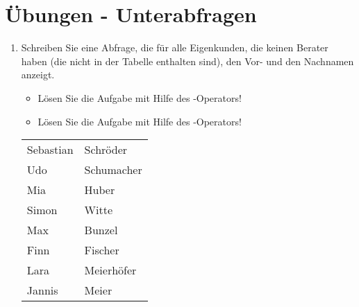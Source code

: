 \clearpage
    \section{\"Ubungen - Unterabfragen}
      \begin{enumerate}
        \item Schreiben Sie eine Abfrage, die f\"ur alle Eigenkunden, die keinen
        Berater haben (die nicht in der Tabelle
         enthalten sind), den Vor- und den
        Nachnamen anzeigt.
        \begin{itemize}
          \item L\"osen Sie die Aufgabe mit Hilfe des -Operators!
          \item L\"osen Sie die Aufgabe mit Hilfe des -Operators!
        \end{itemize}
        \begin{center}
          \begin{small}
            \tablehead{}
            \begin{msoraclesql}
              \begin{supertabular}{ll}
                Sebastian & Schr\"oder \\
                Udo & Schumacher \\
                Mia & Huber \\
                Simon & Witte \\
                Max & Bunzel \\
                Finn & Fischer \\
                Lara & Meierh\"ofer \\
                Jannis & Meier \\
              \end{supertabular}
            \end{msoraclesql}
          \end{small}

\end{center}
\end{enumerate}
